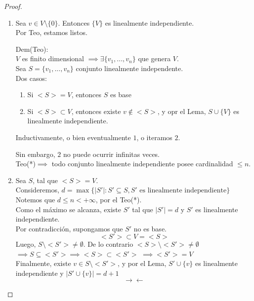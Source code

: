 \documentclass[11pt]{book}
\theoremstyle{definition}
\begin{document}
\begin{proof}
\begin{enumerate}[label=\alph*)]
	\item Sea $v\in V\setminus\{0\}$. Entonces $\{V\}$ es linealmente independiente.\\
	Por Teo, estamos listos.
	
	Dem(Teo):\\
	$V$ es finito dimensional $\implies\exists\{v_1,...,v_n\}$ que genera $V$.\\
	Sea $S=\{v_1,...,v_n\}$ conjunto linealmente independente.\\
	Dos casos:
	\begin{enumerate}
		\item Si $<S>=V$, entonces $S$ es base
		
		\item Si $<S>\subset V$, entonces existe $v\notin<S>$, y opr el Lema, $S\cup\{V\}$ es linealmente independiente.
	\end{enumerate}
	Inductivamente, o bien eventualmente $1$, o iteramos $2$.
	
	Sin embargo, $2$ no puede ocurrir infinitas veces.\\
	Teo(*)$\implies$ todo conjunto linealmente independiente posee cardinalidad $\leq n$.
	
	\item Sea $S$, tal que $<S>=V$.\\
	Consideremos, $d=\max\{|S'|:S'\subseteq S, S'\textrm{ es linealmente independiente}\}$\\
	Notemos que $d\leq n<+\infty$, por el Teo(*).\\
	Como el máximo se alcanza, existe $S'$ tal que $|S'|=d$ y $S'$ es linealmente independiente.\\
	Por contradicción, supongamos que $S'$ no es base.
	\[
	<S'>\subset V=<S>
	\]
	Luego, $S\setminus<S'>\neq\emptyset$. De lo contrario $<S>\setminus<S'>\neq\emptyset$\\
	$\implies S\subseteq <S'>\implies <S>\subset<S'>$
	$\implies <S'>=V$\\
	Finalmente, existe $v\in S\setminus<S'>$, y por el Lema, $S'\cup\{v\}$ es linealmente independiente y $|S'\cup\{v\}|=d+1$
	\[
	\rightarrow\leftarrow
	\]
\end{enumerate}
\end{proof}
\end{document}
